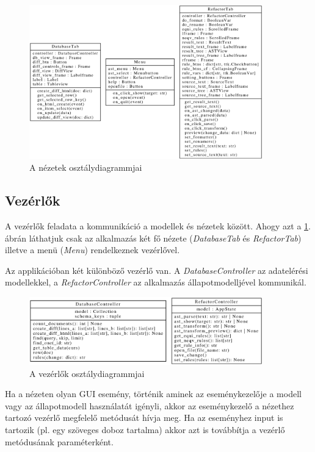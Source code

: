 \begin{figure}[H]
	\centering
	\includegraphics[width=0.9\textwidth]{images/uml/views.eps}
	\caption{\label{fig:views}A nézetek osztálydiagrammjai}
\end{figure}

\subsection{Vezérlők}

A vezérlők feladata a kommunikáció a modellek és nézetek között.
Ahogy azt a \ref{fig:views}. ábrán láthatjuk csak az alkalmazás
két fő nézete (\emph{DatabaseTab} és \emph{RefactorTab})
illetve a menü (\emph{Menu}) rendelkeznek vezérlővel.

Az applikációban két különböző vezérlő van.
A \emph{DatabaseController} az adatelérési modellekkel,
a \emph{RefactorController} az alkalmazás állapotmodelljével kommunikál.

\begin{figure}[H]
	\centering
	\includegraphics[width=0.9\textwidth]{images/uml/controllers.eps}
	\caption{\label{fig:controllers}A vezérlők osztálydiagrammjai}
\end{figure}

Ha a nézeten olyan GUI esemény, történik aminek az eseménykezelője
a modell vagy az állapotmodell használatát igényli,
akkor az eseménykezelő a nézethez tartozó vezérlő megfelelő metódusát hívja meg.
Ha az eseményhez input is tartozik (pl. egy szöveges doboz tartalma) akkor
azt is továbbítja a vezérlő metódusának paraméterként.

